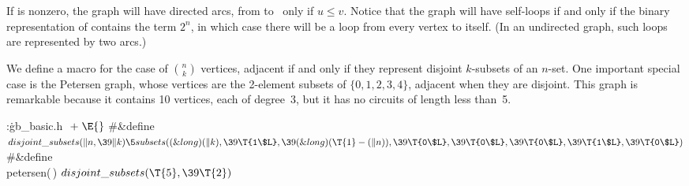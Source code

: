 If  is nonzero, the graph will have directed arcs, from 
to~ only if $u\le v$. Notice that the graph will have self-loops if
and only if the binary representation of  contains the term
$2^n$, in which case there will be a loop from every vertex to itself.
(In an undirected graph, such loops are represented by two arcs.)

We define a macro  for the case
of $n\choose k$ vertices, adjacent if and only if they represent
disjoint $k$-subsets of an $n$-set.
One important special case is the Petersen graph, whose vertices
are the 2-element subsets of $\{0,1,2,3,4\}$, adjacent when they
are disjoint. This graph is remarkable because it contains 10 vertices,
each of degree~3, but it has no circuits of length less than~5.

\Y\B\4:\.{gb\_basic.h }\X${}\mathrel+\E{}$\6
\8\#\&{define} ${}\\{disjoint\_subsets}(\|n,\39\|k) \5\\{subsets}((\&{long})(%
\|k),\39\T{1\$L},\39(\&{long})(\T{1}-(\|n)),\39\T{0\$L},\39\T{0\$L},\39\T{0%
\$L},\39\T{1\$L},\39\T{0\$L}){}$\6
\8\#\&{define} \\{petersen}(\,) \5${}\\{disjoint\_subsets}(\T{5},\39\T{2}){}$%
\par
\fi

